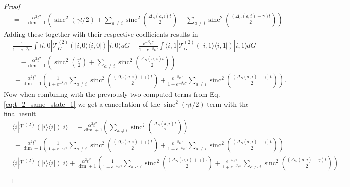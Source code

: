 \documentclass{article}
\newcommand{\ket}[1]{|#1\rangle}
\newcommand{\bra}[1]{\langle #1|}
\newcommand{\ketbra}[2]{| #1\rangle\! \langle #2|}
\newcommand{\parens}[1]{\left( #1 \right)}
\DeclareMathOperator{\sinc}{sinc}
\begin{document}
\begin{proof}
\begin{align}
        &=- \frac{\alpha^2 t^2}{\dim  + 1} \parens{\sinc^2 (\gamma t / 2) + \sum_{a \neq i} \sinc^2 \left( \frac{\Delta_S(a, i) t}{2} \right) + \sum_{a \neq i} \sinc^2\parens{\frac{(\Delta_S(a, i) - \gamma)t}{2}} }
    \end{align}
    Adding these together with their respective coefficients results in
    \begin{align}
        &\frac{1}{1 + e^{-\beta_E \gamma}} \int \bra{i, 0} \mathcal{T}^{(2)}_G (\ketbra{i, 0}{i, 0}) \ket{i, 0} dG + \frac{e^{-\beta_E \gamma}}{1 + e^{-\beta_E \gamma}} \int \bra{i, 1} \mathcal{T}^{(2)}_G (\ketbra{i, 1}{i, 1}) \ket{i, 1} dG \\
        &= - \frac{\alpha^2 t^2}{\dim + 1} \left( \sinc^2\parens{\frac{\gamma t}{2}} + \sum_{a \neq i} \sinc^2\parens{\frac{\Delta_S(a,i)t}{2}} \right) \nonumber \\
        &~ - \frac{\alpha^2 t^2}{\dim + 1} \left( \frac{1}{1 + e^{-\beta_E \gamma}}\sum_{a \neq i} \sinc^2\parens{\frac{(\Delta_S(a, i) +\gamma)t}{2}}  + \frac{e^{-\beta_E \gamma}}{1 + e^{-\beta_E \gamma}}\sum_{a \neq i} \sinc^2\parens{\frac{(\Delta_S(a, i) -\gamma)t}{2}} \right).
    \end{align}
    Now when combining with the previously two computed terms from Eq. \eqref{eq:t_2_same_state_1} we get a cancellation of the $\sinc^2(\gamma t/ 2)$ term with the final result
    \begin{align}
        &\bra{i} \mathcal{T}^{(2)}(\ketbra{i}{i})\ket{i} = - \frac{\alpha^2 t^2}{\dim + 1} \left(\sum_{a \neq i} \sinc^2\parens{\frac{\Delta_S(a,i)t}{2}}  \right) \nonumber \\
        &~ - \frac{\alpha^2 t^2}{\dim + 1} \left( \frac{1}{1 + e^{-\beta_E \gamma}}\sum_{a \neq i} \sinc^2\parens{\frac{(\Delta_S(a, i) +\gamma)t}{2}}  + \frac{e^{-\beta_E \gamma}}{1 + e^{-\beta_E \gamma}}\sum_{a \neq i} \sinc^2\parens{\frac{(\Delta_S(a, i) -\gamma)t}{2}} \right) \\
        &\bra{i} \mathcal{T}^{(2)}(\ketbra{i}{i})\ket{i} + \frac{\alpha^2 t^2}{\dim + 1} \left( \frac{1}{1 + e^{-\beta_E \gamma}}\sum_{a < i} \sinc^2\parens{\frac{(\Delta_S(a, i) +\gamma)t}{2}}  + \frac{e^{-\beta_E \gamma}}{1 + e^{-\beta_E \gamma}}\sum_{a > i} \sinc^2\parens{\frac{(\Delta_S(a, i) -\gamma)t}{2}} \right) = \nonumber \\

\end{align}
\end{proof}
\end{document}
